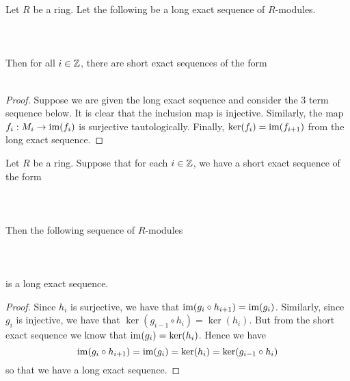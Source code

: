 \documentclass[a4paper]{article}
\begin{document}
\begin{prp}{}{} Let $R$ be a ring. Let the following be a long exact sequence of $R$-modules. \\~\\
\\~\\
Then for all $i\in\mathbb{Z}$, there are short exact sequences of the form \\~\\
\begin{proof}
Suppose we are given the long exact sequence and consider the 3 term sequence below. It is clear that the inclusion map is injective. Similarly, the map $f_i:M_i\to\operatorname{im}(f_i)$ is surjective tautologically. Finally, $\ker(f_i)=\operatorname{im}(f_{i+1})$ from the long exact sequence. 
\end{proof}
\end{prp}

\begin{prp}{}{} Let $R$ be a ring. Suppose that for each $i\in\mathbb{Z}$, we have a short exact sequence of the form \\~\\
 \\~\\
Then the following sequence of $R$-modules \\~\\
\\~\\
is a long exact sequence. 
\begin{proof}
Since $h_i$ is surjective, we have that $\operatorname{im}(g_i\circ h_{i+1})=\operatorname{im}(g_i)$. Similarly, since $g_i$ is injective, we have that $\ker(g_{i-1}\circ h_i)=\ker(h_i)$. But from the short exact sequence we know that $\operatorname{im}(g_i)=\ker(h_i)$. Hence we have $$\operatorname{im}(g_i\circ h_{i+1})=\operatorname{im}(g_i)=\ker(h_i)=\ker(g_{i-1}\circ h_i)$$ so that we have a long exact sequence. 
\end{proof}
\end{prp}
\end{document}
